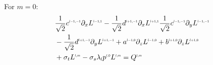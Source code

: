 For $m=0$:
\begin{align}
&
\frac{1}{\sqrt{2}}c^{\scaleto{l-1,-1}{4pt}}\partial_x L^{\scaleto{l-1,1}{4pt}}
-\frac{1}{\sqrt{2}}d^{\scaleto{l+1,-1}{4pt}}\partial_x L^{\scaleto{l+1,1}{4pt}}
\frac{1}{\sqrt{2}}c^{\scaleto{l-1,-1}{4pt}}\partial_y L^{\scaleto{l-1,-1}{4pt}}
\nonumber
\\&
-\frac{1}{\sqrt{2}}d^{\scaleto{l+1,-1}{4pt}}\partial_y L^{\scaleto{l+1,-1}{4pt}}
+a^{\scaleto{l-1,0}{4pt}}\partial_z L^{\scaleto{l-1,0}{4pt}}
+b^{\scaleto{l+1,0}{4pt}}\partial_z L^{\scaleto{l+1,0}{4pt}}
\nonumber
\\&
+\sigma_t L^{\scaleto{l,m}{4pt}}
-\sigma_s\lambda_{\scaleto{l}{4pt}}p^{\scaleto{l,0}{4pt}}L^{\scaleto{l,m}{4pt}}
= Q^{\scaleto{l,m}{4pt}}
\label{eq:rpn_m_=_z}
\end{align}


